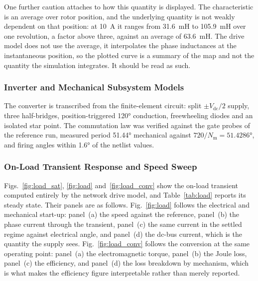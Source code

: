 \documentclass[10pt,a4paper,twocolumn]{article}
\theoremstyle{plain}
\theoremstyle{remark}
\begin{document}
One further caution attaches to how this quantity is displayed. The
characteristic is an average over rotor position, and the underlying
quantity is not weakly dependent on that position: at
\SI{10}{\ampere} it ranges from \SI{31.6}{\milli\henry} to
\SI{105.9}{\milli\henry} over one revolution, a factor above three,
against an average of \SI{63.6}{\milli\henry}. The drive model does not
use the average, it interpolates the phase inductances at the
instantaneous position, so the plotted curve is a summary of the map
and not the quantity the simulation integrates. It should be read as
such.

\subsubsection{Inverter and Mechanical Subsystem Models}

The converter is transcribed from the finite-element circuit: split
$\pm V_{\mathrm{dc}}/2$ supply, three half-bridges, position-triggered
\ang{120} conduction, freewheeling diodes and an isolated star point.
The commutation law was verified against the gate probes of the
reference run, measured period \ang{51.44} mechanical against
$720/N_{\mathrm{m}}=\ang{51.4286}$, and firing angles within
\ang{1.6} of the netlist values.

\subsubsection{On-Load Transient Response and Speed Sweep}
\label{sub:drive_results}

Figs.~\ref{fig:load_sat}, \ref{fig:load} and~\ref{fig:load_conv} show
the on-load transient computed entirely by the network drive model, and
Table~\ref{tab:load} reports its steady state. Their panels are as
follows. Fig.~\ref{fig:load} follows the electrical and mechanical
start-up: panel~(a) the speed against the reference, panel~(b) the phase
current through the transient, panel~(c) the same current in the settled
regime against electrical angle, and panel~(d) the dc-bus current, which
is the quantity the supply sees. Fig.~\ref{fig:load_conv} follows the
conversion at the same operating point: panel~(a) the electromagnetic
torque, panel~(b) the Joule loss, panel~(c) the efficiency, and
panel~(d) the loss breakdown by mechanism, which is what makes the
efficiency figure interpretable rather than merely reported.
\end{document}
